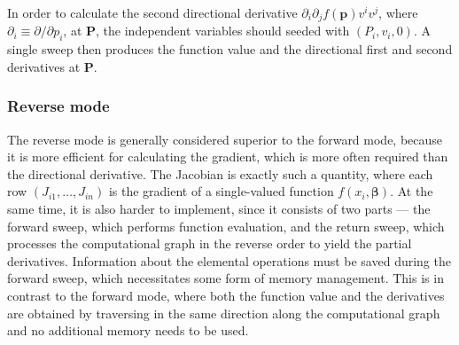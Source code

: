 \documentclass{article}
\begin{document}
In order to calculate the second directional derivative $\partial_i\partial_j f(\bm p) v^iv^j$, where $\partial_i \equiv \partial/\partial p_i$, at $\bm P$, the independent variables should seeded with $(P_i, v_i, 0)$. A single sweep then produces the function value and the directional first and second derivatives at $\bm P$.

\subsubsection{Reverse mode}

The reverse mode is generally considered superior to the forward mode, because it is more efficient for calculating the gradient, which is more often required than the directional derivative. The Jacobian is exactly such a quantity, where each row $(J_{i1}, \ldots, J_{in})$ is the gradient of a single-valued function $f(x_i, \bm\beta)$. At the same time, it is also harder to implement, since it consists of two parts --- the forward sweep, which performs function evaluation, and the return sweep, which processes the computational graph in the reverse order to yield the partial derivatives. Information about the elemental operations must be saved during the forward sweep, which necessitates some form of memory management. This is in contrast to the forward mode, where both the function value and the derivatives are obtained by traversing in the same direction along the computational graph and no additional memory needs to be used.
\end{document}
